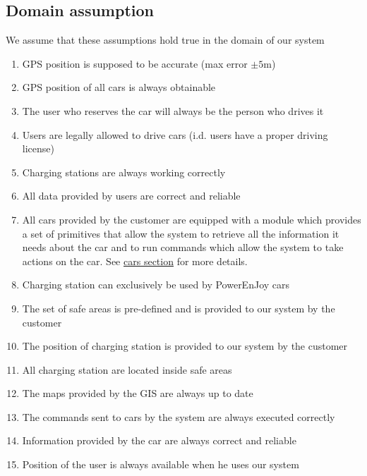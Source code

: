\subsection{Domain assumption}
	We assume that these assumptions hold true in the domain of our system 
	\begin{enumerate}[label=\textbf{DA\arabic*}]
		\item GPS position is supposed to be accurate (max error $\pm5$m)
		\item GPS position of all cars is always obtainable
		\item The user who reserves the car will always be the person who drives it
		\item Users are legally allowed to drive cars (i.d. users have a proper driving license)
		\item Charging stations are always working correctly
		\item All data provided by users are correct and reliable
		\item All cars provided by the customer are equipped with a module which provides a set of
		primitives that allow the system to retrieve all the information it needs about
		the car and to run commands which allow the system to take actions on the car. See \hyperref[sec:cars]{cars section} for more details.
		\item Charging station can exclusively be used by PowerEnJoy cars
		\item The set of safe areas is pre-defined and is provided to our system by the customer
		\item The position of charging station is provided to our system by the customer
		\item All charging station are located inside safe areas
		\item The maps provided by the GIS are always up to date
		\item The commands sent to cars by the system are always executed
		correctly
		\item Information provided by the car are always correct and reliable
		\item Position of the user is always available when he uses our system
		
	\end{enumerate}
	
\clearpage
